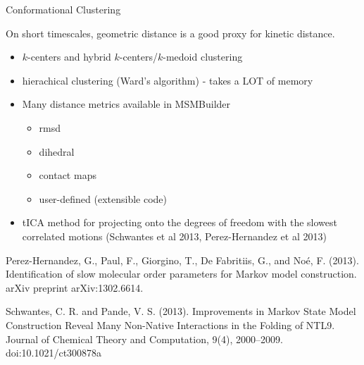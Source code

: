 \documentclass{beamer}
\begin{document}
\begin{frame}{Conformational Clustering }

On short timescales, geometric distance is a good proxy for kinetic distance.

\begin{itemize}
  \item $k$-centers and hybrid $k$-centers/$k$-medoid clustering
  \item hierachical clustering (Ward's algorithm) - takes a LOT of memory
  \item Many distance metrics available in MSMBuilder
  \begin{itemize}
      \item rmsd
      \item dihedral
      \item contact maps 
      \item user-defined (extensible code)
  \end{itemize}
  \item tICA method for projecting onto the degrees of freedom with the slowest correlated motions (Schwantes et al 2013, Perez-Hernandez et al 2013)
\end{itemize}

\tiny
Perez-Hernandez, G., Paul, F., Giorgino, T., De Fabritiis, G., and Noé, F. (2013). Identification of slow molecular order parameters for Markov model construction. arXiv preprint arXiv:1302.6614.

Schwantes, C. R. and Pande, V. S. (2013). Improvements in Markov State Model Construction Reveal Many Non-Native Interactions in the Folding of NTL9. Journal of Chemical Theory and Computation, 9(4), 2000–2009. doi:10.1021/ct300878a


\end{frame}
\end{document}
